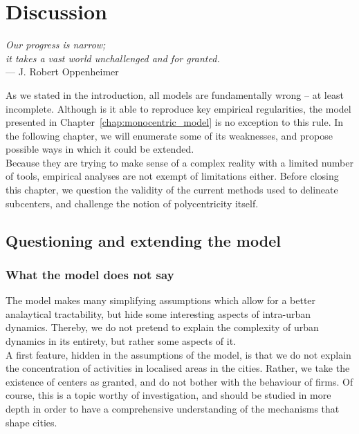 \chapter{Discussion}
\label{chap:monocentric_discussion}

\begin{flushright}{\slshape    
Our progress is narrow;\\
it takes a vast world unchallenged and for granted.}  \\ \medskip
--- J. Robert Oppenheimer~\cite{Oppenheimer:1954}
\end{flushright}


\bigskip

As we stated in the introduction, all models are fundamentally wrong -- at least
incomplete. Although is it able to reproduce key empirical regularities, the
model presented in Chapter~\ref{chap:monocentric_model} is no exception to this
rule. In the following chapter, we will enumerate some of its weaknesses, and
propose possible ways in which it could be extended.\\

Because they are trying to make sense of a complex reality with a limited number
of tools, empirical analyses are not exempt of limitations either. Before
closing this chapter, we question the validity of the current methods used to
delineate subcenters, and challenge the notion of polycentricity itself.

\section{Questioning and extending the model}
\label{sec:model}

\subsection{What the model does not say}
\label{sec:what_the_model_does_not_say}

The model makes many simplifying assumptions which allow for a better
analaytical tractability, but hide some interesting aspects of intra-urban
dynamics. Thereby, we do not pretend to explain the complexity of
urban dynamics in its entirety, but rather some aspects of it.\\ 

A first feature, hidden in the assumptions of the model, is that we do not
explain the concentration of activities in localised areas in the cities.
Rather, we take the existence of centers as granted, and do not bother with the
behaviour of firms. Of course, this is a topic worthy of investigation, and
should be studied in more depth in order to have a comprehensive understanding
of the mechanisms that shape cities.

